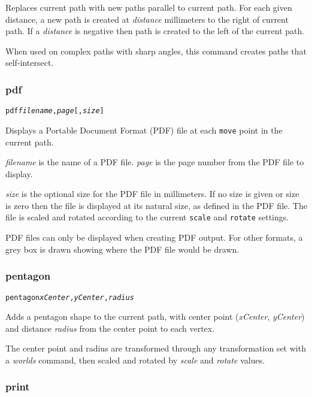 Replaces current path with new paths parallel to current path.
For each given distance, a new path is created at \textit{distance}
millimeters to the right of current path.  If a \textit{distance} is
negative then path is created to the left of the current path.

When used on complex paths with sharp angles, this command creates
paths that self-intersect.

\subsubsection{pdf}

\begin{alltt}
pdf \textit{filename}, \textit{page} [, \textit{size}]
\end{alltt}

Displays a Portable Document Format (PDF) file at each \texttt{move} point in
the current path.  

\textit{filename} is the name of a PDF file.
\textit{page} is the page number from the PDF file to display.

\textit{size} is the optional size for the PDF file
in millimeters.  If no size
is given or size is zero then the file is displayed at its natural size,
as defined in the PDF file.
The file is scaled and rotated according to the current \texttt{scale}
and \texttt{rotate} settings.

PDF files can only be displayed when creating
PDF output.  For other formats,
a grey box is drawn showing where the PDF file
would be drawn.

\subsubsection{pentagon}

\begin{alltt}
pentagon \textit{xCenter}, \textit{yCenter}, \textit{radius}
\end{alltt}

Adds a pentagon shape to the current path, with center
point (\textit{xCenter}, \textit{yCenter}) and distance
\textit{radius}
from the center point to each vertex.

The center point and radius are transformed through any
transformation set with a \textit{worlds} command,
then scaled and rotated by \textit{scale}
and \textit{rotate} values.

\subsubsection{print}

